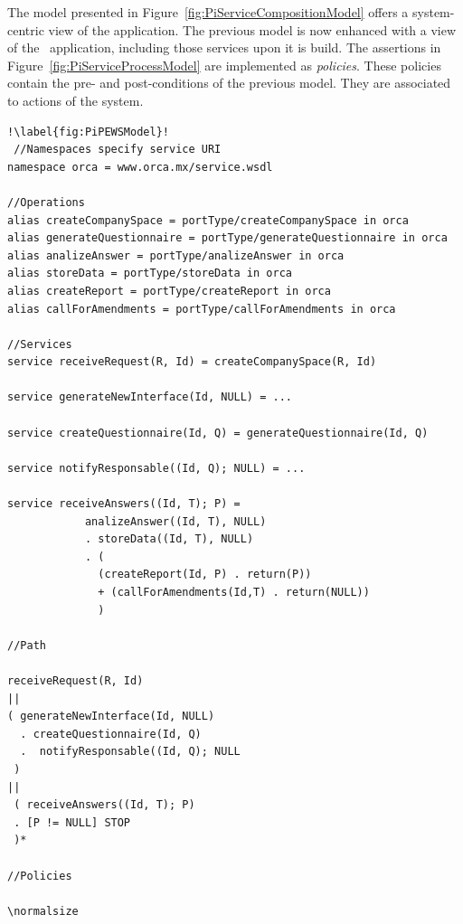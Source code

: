The model presented in Figure~\ref{fig:PiServiceCompositionModel} offers a system-centric view of the application.
The previous model is now enhanced with a view of the \FlyingPig\ application, including those services upon  it is build.
The assertions in Figure~\ref{fig:PiServiceProcessModel} are implemented as \textit{policies}.
These policies contain the pre- and post-conditions of the previous model.
They are associated to actions of the system.


\begin{lstlisting}[label=list:flyingPigPiPEWS,caption=pi-PEWS
Specification: FlyingPig. ]!\label{fig:PiPEWSModel}!
 //Namespaces specify service URI
namespace orca = www.orca.mx/service.wsdl

//Operations
alias createCompanySpace = portType/createCompanySpace in orca
alias generateQuestionnaire = portType/generateQuestionnaire in orca
alias analizeAnswer = portType/analizeAnswer in orca
alias storeData = portType/storeData in orca
alias createReport = portType/createReport in orca
alias callForAmendments = portType/callForAmendments in orca

//Services
service receiveRequest(R, Id) = createCompanySpace(R, Id)

service generateNewInterface(Id, NULL) = ...

service createQuestionnaire(Id, Q) = generateQuestionnaire(Id, Q)

service notifyResponsable((Id, Q); NULL) = ...

service receiveAnswers((Id, T); P) =
			analizeAnswer((Id, T), NULL) 
			. storeData((Id, T), NULL)
			. (
			  (createReport(Id, P) . return(P))
			  + (callForAmendments(Id,T) . return(NULL))
			  )
  
//Path

receiveRequest(R, Id)
||
( generateNewInterface(Id, NULL)
  . createQuestionnaire(Id, Q)
  .  notifyResponsable((Id, Q); NULL
 )
||
 ( receiveAnswers((Id, T); P)
 . [P != NULL] STOP
 )*	
 
//Policies 					  

\normalsize
\end{lstlisting}
%

